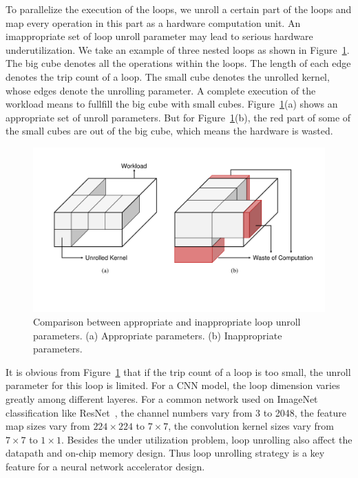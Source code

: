 To parallelize the execution of the loops, we unroll a certain part of the loops and map every operation in this part as a hardware computation unit. An imappropriate set of loop unroll parameter may lead to serious hardware underutilization. We take an example of three nested loops as shown in Figure~\ref{fig:unrolling}. The big cube denotes all the operations within the loops. The length of each edge denotes the trip count of a loop. The small cube denotes the unrolled kernel, whose edges denote the unrolling parameter. A complete execution of the workload means to fullfill the big cube with small cubes. Figure~\ref{fig:unrolling}(a) shows an appropriate set of unroll parameters. But for Figure~\ref{fig:unrolling}(b), the red part of some of the small cubes are out of the big cube, which means the hardware is wasted.

\begin{figure}[t]
    \centering
    \includegraphics[width=0.8\columnwidth]{fig/unrolling.pdf}
    \caption{Comparison between appropriate and inappropriate loop unroll parameters. (a) Appropriate parameters. (b) Inappropriate parameters.}
    \label{fig:unrolling}
\end{figure}

It is obvious from Figure~\ref{fig:unrolling} that if the trip count of a loop is too small, the unroll parameter for this loop is limited. For a CNN model, the loop dimension varies greatly among different layeres. For a common network used on ImageNet classification like ResNet~\cite{he2016deep}, the channel numbers vary from 3 to 2048, the feature map sizes vary from $224\times 224$ to $7\times 7$, the convolution kernel sizes vary from $7\times 7$ to $1\times 1$. Besides the under utilization problem, loop unrolling also affect the datapath and on-chip memory design. Thus loop unrolling strategy is a key feature for a neural network accelerator design. 

